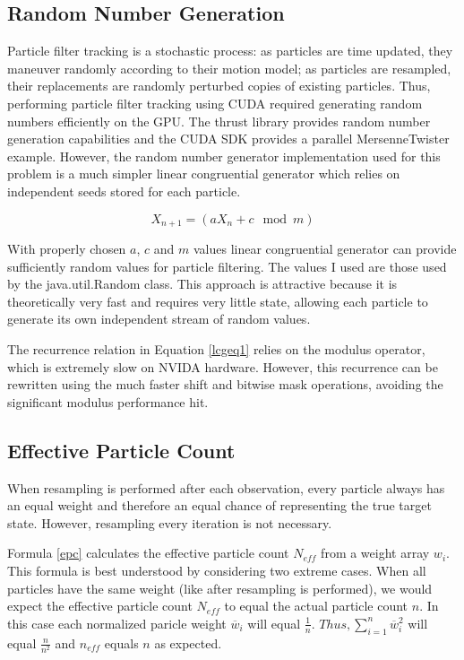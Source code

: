 \documentclass{article}
\begin{document}
\subsection{Random Number Generation}
Particle filter tracking is a stochastic process: as particles are time updated, they maneuver randomly according to their motion model; as particles are resampled, their replacements are randomly perturbed copies of existing particles. Thus, performing particle filter tracking using CUDA required generating random numbers efficiently on the GPU. The thrust library provides random number generation capabilities and the CUDA SDK provides a parallel MersenneTwister example. However, the random number generator implementation used for this problem is a much simpler linear congruential generator which relies on independent seeds stored for each particle.

\begin{equation}\label{lcgeq1}
X_{n+1}=(aX_{n}+c \mod m)
\end{equation}

With properly chosen \(a\), \(c\) and \(m\) values linear congruential generator can provide sufficiently random values for particle filtering.\cite{lcg} The values I used are those used by the java.util.Random class. This approach is attractive because it is theoretically very fast and requires very little state, allowing each particle to generate its own independent stream of random values.

The recurrence relation in Equation \ref{lcgeq1} relies on the modulus operator, which is extremely slow on NVIDA hardware.\cite{oprc} However, this recurrence can be rewritten using the much faster shift and bitwise mask operations, avoiding the significant modulus performance hit.

\subsection{Effective Particle Count}
When resampling is performed after each observation, every particle always has an equal weight and therefore an equal chance of representing the true target state. However, resampling every iteration is not necessary.

Formula \ref{epc} calculates the effective particle count \(N_{eff}\) from a weight array \(w_{i}\).\cite{pf} This formula is best understood by considering two extreme cases. When all particles have the same weight (like after resampling is performed), we would expect the effective particle count \(N_{eff}\) to equal the actual particle count \(n\). In this case each normalized paricle weight \(\overline{w}_{i}\) will equal \(\frac{1}{n}\). \( Thus, \sum_{i=1}^{n} \overline{w}_{i}^2 \) will equal \(\frac{n}{n^{2}}\) and \(n_{eff}\) equals \(n\) as expected.
\end{document}
